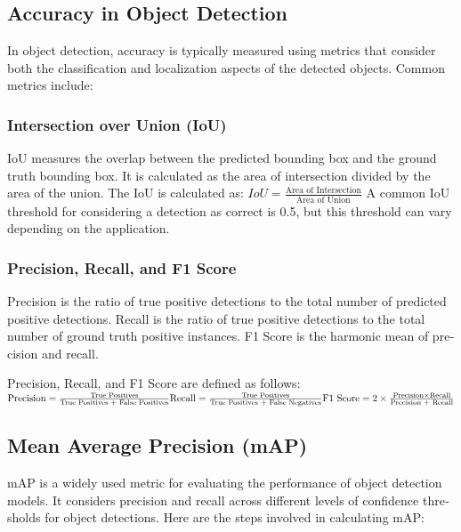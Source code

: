 \documentclass{article}
\begin{document}
\section{}
\begin{latin}
\subsection*{Accuracy in Object Detection}
In object detection, accuracy is typically measured using metrics that consider both the classification and localization aspects of the detected objects. Common metrics include:

\subsubsection*{Intersection over Union (IoU)}

IoU measures the overlap between the predicted bounding box and the ground truth bounding box. It is calculated as the area of intersection divided by the area of the union.
The IoU is calculated as:
$
IoU = \frac{\text{Area of Intersection}}{\text{Area of Union}}
$
A common IoU threshold for considering a detection as correct is 0.5, but this threshold can vary depending on the application.

\subsubsection*{Precision, Recall, and F1 Score}
Precision is the ratio of true positive detections to the total number of predicted positive detections. Recall is the ratio of true positive detections to the total number of ground truth positive instances. F1 Score is the harmonic mean of precision and recall.

Precision, Recall, and F1 Score are defined as follows:
$
\text{Precision} = \frac{\text{True Positives}}{\text{True Positives + False Positives}}
\\
\text{Recall} = \frac{\text{True Positives}}{\text{True Positives + False Negatives}}
\\
\text{F1 Score} = 2 \times \frac{\text{Precision} \times \text{Recall}}{\text{Precision + Recall}}
$

\subsection*{Mean Average Precision (mAP)}
mAP is a widely used metric for evaluating the performance of object detection models. It considers precision and recall across different levels of confidence thresholds for object detections. Here are the steps involved in calculating mAP:


\end{latin}
\end{document}
